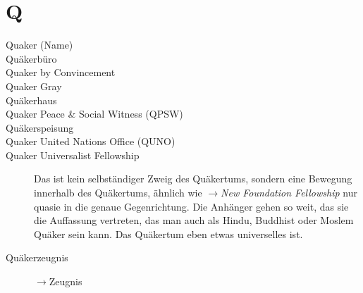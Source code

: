 \section*{Q}

\articlesize

\begin{description}

 \item[Quaker (Name)]

 \item[Quäkerbüro]

 \item[Quaker by Convincement]

 \item[Quaker Gray]

 \item[Quäkerhaus]

 \item[Quaker Peace \& Social Witness (QPSW)]

 \item[Quäkerspeisung]

 \item[Quaker United Nations Office (QUNO)]

 \item[Quaker Universalist Fellowship] Das ist kein selbständiger Zweig des Quäkertums, sondern eine Bewegung innerhalb des Quäkertums, ähnlich wie $\to$\textit{New Foundation Fellowship} nur quasie in die genaue Gegenrichtung. Die Anhänger gehen so weit, das sie die Auffassung vertreten, das man auch als Hindu, Buddhist oder Moslem Quäker sein kann. Das Quäkertum eben etwas universelles ist.

 \item[Quäkerzeugnis] $\to$Zeugnis


 \end{description}

\normalsize
